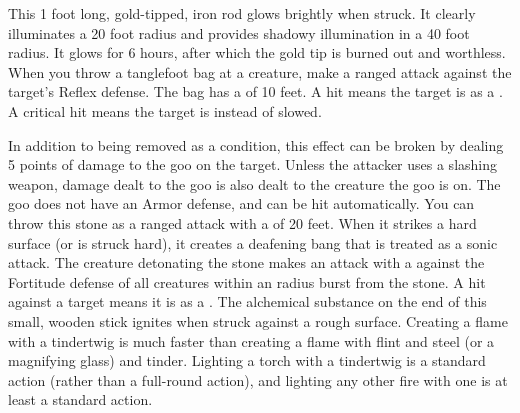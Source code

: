  This 1 foot long, gold-tipped, iron rod glows brightly when struck. It clearly illuminates a 20 foot radius and provides shadowy illumination in a 40 foot radius. It glows for 6 hours, after which the gold tip is burned out and worthless.
 When you throw a tanglefoot bag at a creature, make a ranged attack against the target's Reflex defense.
The bag has a  of 10 feet.
A hit means the target is \slowed as a .
A critical hit means the target is \immobilized instead of slowed.
\par In addition to being removed as a condition, this effect can be broken by dealing 5 points of damage to the goo on the target.
Unless the attacker uses a slashing weapon, damage dealt to the goo is also dealt to the creature the goo is on.
The goo does not have an Armor defense, and can be hit automatically.  %
 You can throw this stone as a ranged attack with a  of 20 feet.
When it strikes a hard surface (or is struck hard), it creates a deafening bang that is treated as a sonic attack.
The creature detonating the stone makes an attack with a   against the Fortitude defense of all creatures within an \areasmall radius burst from the stone.
A hit against a target means it is \deafened as a .
 The alchemical substance on the end of this small, wooden stick ignites when struck against a rough surface. Creating a flame with a tindertwig is much faster than creating a flame with flint and steel (or a magnifying glass) and tinder. Lighting a torch with a tindertwig is a standard action (rather than a full-round action), and lighting any other fire with one is at least a standard action.

